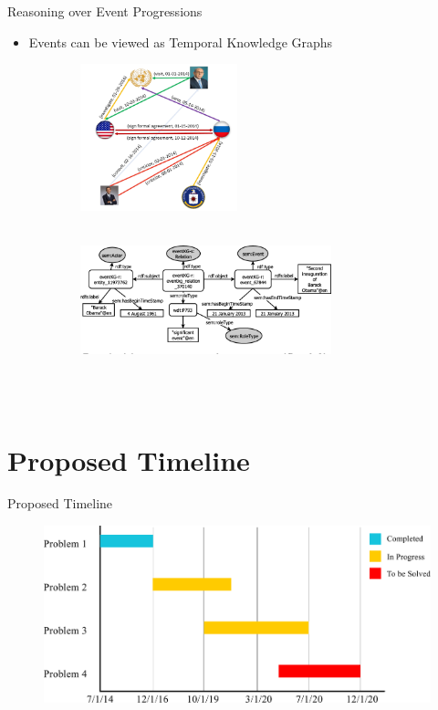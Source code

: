 \begin{frame}{Reasoning over Event Progressions}
    \begin{itemize}
        \item Events can be viewed as Temporal Knowledge Graphs
    \end{itemize}
\begin{figure}
     \centering
     \begin{subfigure}[b]{0.5\textwidth}
         \centering
         \includegraphics[width=0.5\textwidth]{Problem4/figures/know-evolve.png}
         \caption{~\cite{trivedi2017know}}
     \end{subfigure}%
     \hfill
     \begin{subfigure}[b]{0.5\textwidth}
         \centering
         \includegraphics[width=0.8\textwidth]{Problem4/figures/EKG.png}
         \caption{~\cite{gottschalk2018eventkg}}
     \end{subfigure}
\end{figure}
\end{frame}

\section{Proposed Timeline}
\begin{frame}{Proposed Timeline}
\begin{figure}
    \centering
    \includegraphics[width=\textwidth]{Problem4/figures/phdTimeline.pdf}
\end{figure}
\end{frame}